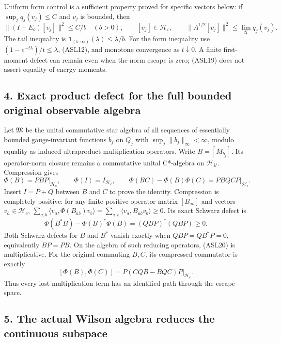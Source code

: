 \documentclass[11pt]{article}
\begin{document}
Uniform form control is a sufficient property proved for specific vectors below: if \(\sup_jq_j(v_j)\le C\) and \(v_j\) is bounded, then
\[
 \|(I-E_b)[v_j]\|^2\le C/b\quad(b>0),\qquad
 [v_j]\in\mathcal H_c,\qquad
 \|A^{1/2}[v_j]\|^2\le\lim_{\mathcal U}q_j(v_j).
 \tag{ASL19}
\]
The tail inequality is \(\mathbf1_{(b,\infty)}(\lambda)\le\lambda/b\). For the form inequality use \((1-e^{-t\lambda})/t\le\lambda\), (ASL12), and monotone convergence as \(t\downarrow0\). A finite first-moment defect can remain even when the norm escape is zero; (ASL19) does not assert equality of energy moments.

\subsection*{4. Exact product defect for the full bounded original observable algebra}

Let \(\mathfrak M\) be the unital commutative star algebra of all sequences of essentially bounded gauge-invariant functions \(b_j\) on \(Q_j\) with \(\sup_j\|b_j\|_\infty<\infty\), modulo equality as induced ultraproduct multiplication operators. Write \(B=[M_{b_j}]\). Its operator-norm closure remains a commutative unital C*-algebra on \(\mathcal H_{\mathcal U}\). Compression gives
\[
 \Phi(B)=PBP|_{\mathcal H_c},\qquad
 \Phi(I)=I_{\mathcal H_c},\qquad
 \boxed{\Phi(BC)-\Phi(B)\Phi(C)=PBQCP|_{\mathcal H_c}.}
 \tag{ASL20}
\]
Insert \(I=P+Q\) between \(B\) and \(C\) to prove the identity. Compression is completely positive: for any finite positive operator matrix \([B_{ab}]\) and vectors \(v_a\in\mathcal H_c\), \(\sum_{a,b}\langle v_a,\Phi(B_{ab})v_b\rangle=\sum_{a,b}\langle v_a,B_{ab}v_b\rangle\ge0\). Its exact Schwarz defect is
\[
 \Phi(B^*B)-\Phi(B)^*\Phi(B)
       =(QBP)^*(QBP)\ge0.
 \tag{ASL21}
\]
Both Schwarz defects for \(B\) and \(B^*\) vanish exactly when \(QBP=QB^*P=0\), equivalently \(BP=PB\). On the algebra of such reducing operators, (ASL20) is multiplicative. For the original commuting \(B,C\), its compressed commutator is exactly
\[
 [\Phi(B),\Phi(C)]=P(CQB-BQC)P|_{\mathcal H_c}.
 \tag{ASL22}
\]
Thus every lost multiplication term has an identified path through the escape space.

\subsection*{5. The actual Wilson algebra reduces the continuous subspace}
\end{document}

